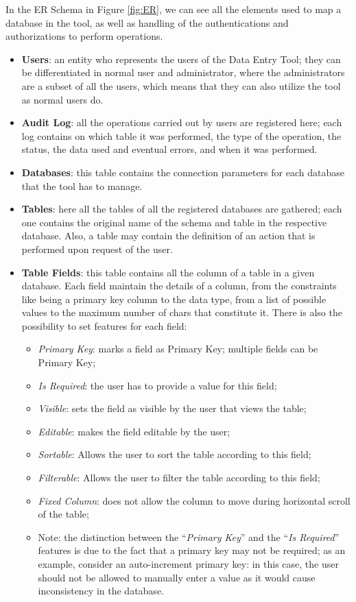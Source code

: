 In the ER Schema in Figure \ref{fig:ER}, we can see all the elements used to map a database in the tool, as well as handling of the authentications and authorizations to perform operations.
\begin{itemize}
    \item \textbf{Users}: an entity who represents the users of the Data Entry Tool; they can be differentiated in normal user and administrator, where the administrators are a subset of all the users, which means that they can also utilize the tool as normal users do.
    
    \item \textbf{Audit Log}: all the operations carried out by users are registered here; each log contains on which table it was performed, the type of the operation, the status, the data used and eventual errors, and when it was performed.
    
    \item \textbf{Databases}: this table contains the connection parameters for each database that the tool has to manage.
    
    \item \textbf{Tables}: here all the tables of all the registered databases are gathered; each one contains the original name of the schema and table in the respective database. Also, a table may contain the definition of an action that is performed upon request of the user.
    
    \item \textbf{Table Fields}: this table contains all the column of a table in a given database. Each field maintain the details of a column, from the constraints like being a primary key column to the data type, from a list of possible values to the maximum number of chars that constitute it. There is also the possibility to set features for each field:
    \begin{itemize}
        \item \emph{Primary Key}: marks a field as Primary Key; multiple fields can be Primary Key;
        \item \emph{Is Required}: the user has to provide a value for this field;
        \item \emph{Visible}: sets the field as visible by the user that views the table;
        \item \emph{Editable}: makes the field editable by the user;
        \item \emph{Sortable}: Allows the user to sort the table according to this field;
        \item \emph{Filterable}: Allows the user to filter the table according to this field;
        \item \emph{Fixed Column}: does not allow the column to move during horizontal scroll of the table;
        \item Note: the distinction between the ``\emph{Primary Key}'' and the ``\emph{Is Required}'' features is due to the fact that a primary key may not be required; as an example, consider an auto-increment primary key: in this case, the user should not be allowed to manually enter a value as it would cause inconsistency in the database.
    \end{itemize}
    

\end{itemize}
